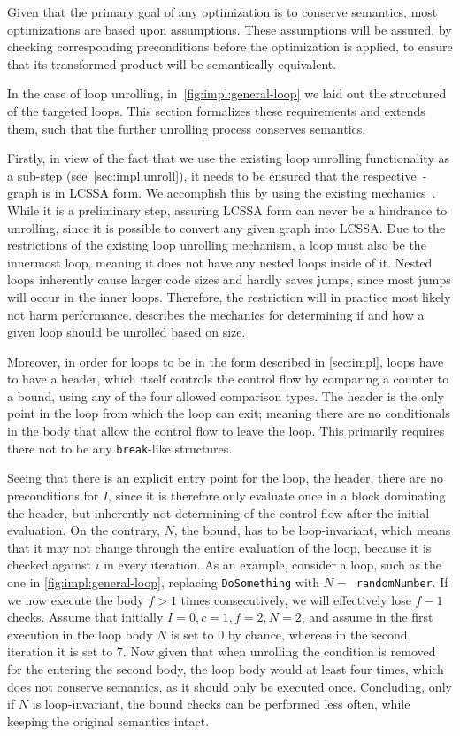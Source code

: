 Given that the primary goal of any optimization is to conserve semantics, most optimizations are based upon assumptions.
These assumptions will be assured, by checking corresponding preconditions before the optimization is applied, to ensure that its transformed product will be semantically equivalent.

In the case of loop unrolling, in~\cref{fig:impl:general-loop} we laid out the structured of the targeted loops.
This section formalizes these requirements and extends them, such that the further unrolling process conserves semantics.

Firstly, in view of the fact that we use the existing loop unrolling functionality as a sub-step (see~\cref{sec:impl:unroll}), it needs to be ensured that the respective~\libFIRM-graph is in LCSSA form.
We accomplish this by using the existing mechanics~\cite{aebi18bachelorarbeit}.
While it is a preliminary step, assuring LCSSA form can never be a hindrance to unrolling, since it is possible to convert any given graph into LCSSA.
Due to the restrictions of the existing loop unrolling mechanism, a loop must also be the innermost loop, meaning it does not have any nested loops inside of it.
Nested loops inherently cause larger code sizes and hardly saves jumps, since most jumps will occur in the inner loops.
Therefore, the restriction will in practice most likely not harm performance.
 describes the mechanics for determining if and how a given loop should be unrolled based on size.

Moreover, in order for loops to be in the form described in \cref{sec:impl}, loops have to have a header, which itself controls the control flow by comparing a counter to a bound, using any of the four allowed comparison types.
The header is the only point in the loop from which the loop can exit; meaning there are no conditionals in the body that allow the control flow to leave the loop.
This primarily requires there not to be any \texttt{break}-like structures.

Seeing that there is an explicit entry point for the loop, the header, there are no preconditions for $I$, since it is therefore only evaluate once in a block dominating the header, but inherently not determining of the control flow after the initial evaluation.
On the contrary, $N$, the bound, has to be loop-invariant, which means that it may not change through the entire evaluation of the loop, because it is checked against $i$ in every iteration.
As an example, consider a loop, such as the one in \cref{fig:impl:general-loop}, replacing \texttt{DoSomething} with \texttt{$N =$ randomNumber}.
If we now execute the body $f > 1$ times consecutively, we will effectively lose $f - 1$ checks.
Assume that initially $I = 0, c = 1, f = 2, N = 2$, and assume in the first execution in the loop body $N$ is set to $0$ by chance, whereas in the second iteration it is set to $7$.
Now given that when unrolling the condition is removed for the entering the second body, the loop body would at least four times, which does not conserve semantics, as it should only be executed once.
Concluding, only if $N$ is loop-invariant, the bound checks can be performed less often, while keeping the original semantics intact.

